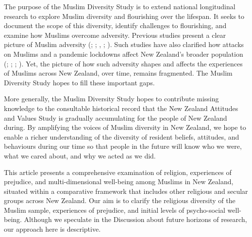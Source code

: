 \documentclass[
  single column]{article}
\begin{document}
The purpose of the Muslim Diversity Study is to extend national
longitudinal research to explore Muslim diversity and flourishing over
the lifespan. It seeks to document the scope of this diversity, identify
challenges to flourishing, and examine how Muslims overcome adversity.
Previous studies present a clear picture of Muslim adversity
(;
;
,
; ). Such studies have also clarified how attacks on
Muslims and a pandemic lockdowns affect New Zealand's broader population
(;
;
;
). Yet, the
picture of how such adversity shapes and affects the experiences of
Muslims across New Zealand, over time, remains fragmented. The Muslim
Diversity Study hopes to fill these important gaps.

More generally, the Muslim Diversity Study hopes to contribute missing
knowledge to the consultable historical record that the New Zealand
Attitudes and Values Study is gradually accumulating for the people of
New Zealand during. By amplifying the voices of Muslim diversity in New
Zealand, we hope to enable a richer understanding of the diversity of
resident beliefs, attitudes, and behaviours during our time so that
people in the future will know who we were, what we cared about, and why
we acted as we did.

This article presents a comprehensive examination of religion,
experiences of prejudice, and multi-dimensional well-being among Muslims
in New Zealand, situated within a comparative framework that includes
other religious and secular groups across New Zealand. Our aim is to
clarify the religious diversity of the Muslim sample, experiences of
prejudice, and initial levels of psycho-social well-being. Although we
speculate in the Discussion about future horizons of research, our
approach here is descriptive.
\end{document}
